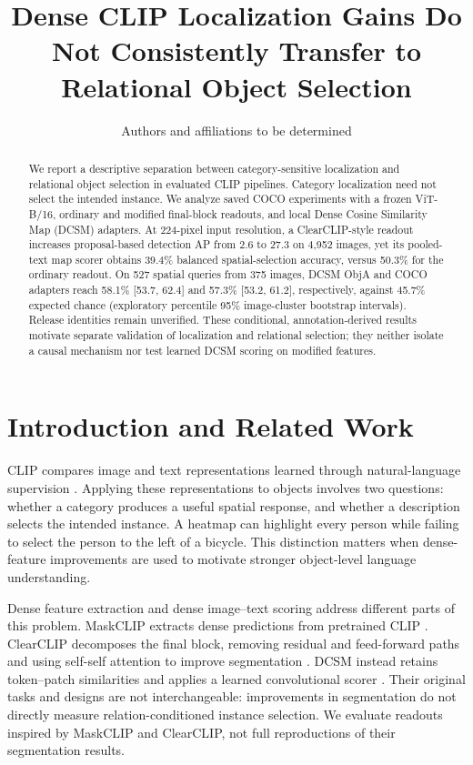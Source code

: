 \documentclass[10pt,twocolumn,letterpaper]{article}
\title{Dense CLIP Localization Gains Do Not Consistently Transfer to Relational Object Selection}
\author{Authors and affiliations to be determined}
\date{}
\begin{document}
\raggedbottom
\maketitle
\begin{abstract}
We report a descriptive separation between category-sensitive
localization and relational object selection in evaluated CLIP
pipelines. Category localization need not select the intended instance.
We analyze saved COCO experiments with a frozen ViT-B/16, ordinary and
modified final-block readouts, and local Dense Cosine Similarity Map
(DCSM) adapters. At 224-pixel input resolution, a ClearCLIP-style
readout increases proposal-based detection AP from 2.6 to 27.3 on 4,952
images, yet its pooled-text map scorer obtains 39.4\% balanced
spatial-selection accuracy, versus 50.3\% for the ordinary readout. On
527 spatial queries from 375 images, DCSM ObjA and COCO adapters reach
58.1\% {[}53.7, 62.4{]} and 57.3\% {[}53.2, 61.2{]}, respectively,
against 45.7\% expected chance (exploratory percentile 95\%
image-cluster bootstrap intervals). Release identities remain
unverified. These conditional, annotation-derived results motivate
separate validation of localization and relational selection; they
neither isolate a causal mechanism nor test learned DCSM scoring on
modified features.
\end{abstract}

\section{Introduction and Related
Work}\label{introduction-and-related-work}

CLIP compares image and text representations learned through
natural-language supervision \citep{radford2021clip}. Applying these
representations to objects involves two questions: whether a category
produces a useful spatial response, and whether a description selects
the intended instance. A heatmap can highlight every person while
failing to select the person to the left of a bicycle. This distinction
matters when dense-feature improvements are used to motivate stronger
object-level language understanding.

Dense feature extraction and dense image--text scoring address different
parts of this problem. MaskCLIP extracts dense predictions from
pretrained CLIP \citep{zhou2021maskclip}. ClearCLIP decomposes the final
block, removing residual and feed-forward paths and using self-self
attention to improve segmentation \citep{lan2024clearclip}. DCSM instead
retains token--patch similarities and applies a learned convolutional
scorer \citep{kang2025dcsm}. Their original tasks and designs are not
interchangeable: improvements in segmentation do not directly measure
relation-conditioned instance selection. We evaluate readouts inspired
by MaskCLIP and ClearCLIP, not full reproductions of their segmentation
results.
\end{document}
